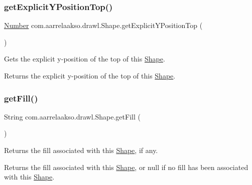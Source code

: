 \subsubsection{\texorpdfstring{get\+Explicit\+Y\+Position\+Top()}{getExplicitYPositionTop()}}
{\footnotesize\ttfamily \hyperlink{interfacecom_1_1aarrelaakso_1_1drawl_1_1_number}{Number} com.\+aarrelaakso.\+drawl.\+Shape.\+get\+Explicit\+Y\+Position\+Top (\begin{DoxyParamCaption}{ }\end{DoxyParamCaption})\hspace{0.3cm}{\ttfamily [protected]}}



Gets the explicit y-\/position of the top of this \hyperlink{classcom_1_1aarrelaakso_1_1drawl_1_1_shape}{Shape}. 

\begin{DoxyReturn}{Returns}
the explicit y-\/position of the top of this \hyperlink{classcom_1_1aarrelaakso_1_1drawl_1_1_shape}{Shape}. 
\end{DoxyReturn}
\mbox{\label{classcom_1_1aarrelaakso_1_1drawl_1_1_shape_a0d9a33a3e151aaceeec140bea343a650}} 
\subsubsection{\texorpdfstring{get\+Fill()}{getFill()}}
{\footnotesize\ttfamily String com.\+aarrelaakso.\+drawl.\+Shape.\+get\+Fill (\begin{DoxyParamCaption}{ }\end{DoxyParamCaption})}



Returns the fill associated with this \hyperlink{classcom_1_1aarrelaakso_1_1drawl_1_1_shape}{Shape}, if any. 

\begin{DoxyReturn}{Returns}
the fill associated with this \hyperlink{classcom_1_1aarrelaakso_1_1drawl_1_1_shape}{Shape}, or null if no fill has been associated with this \hyperlink{classcom_1_1aarrelaakso_1_1drawl_1_1_shape}{Shape}. 
\end{DoxyReturn}
\mbox{\label{classcom_1_1aarrelaakso_1_1drawl_1_1_shape_ac9f74d31c332aab76b329edc22080e67}} 

